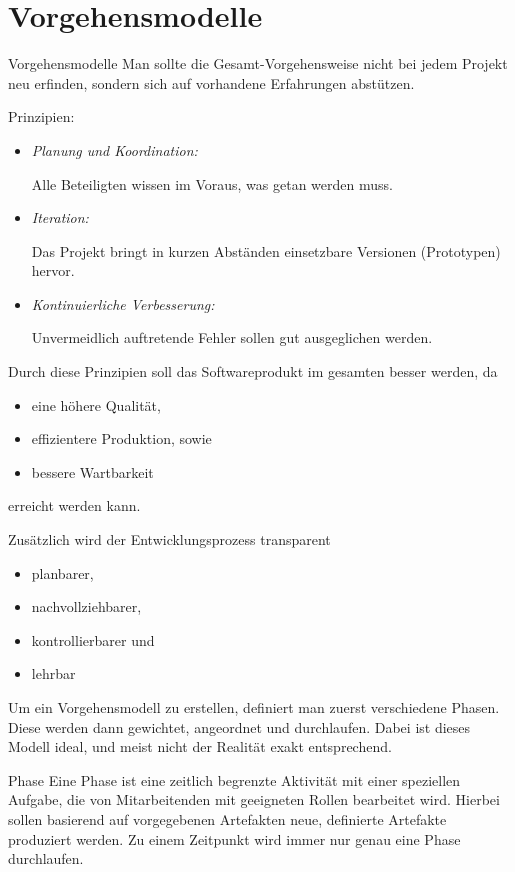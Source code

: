 \section{Vorgehensmodelle}

\begin{defi}{Vorgehensmodelle}
    Man sollte die Gesamt-Vorgehensweise nicht bei jedem Projekt neu erfinden, sondern sich auf vorhandene Erfahrungen abstützen.

    Prinzipien:
    \begin{itemize}
        \item \emph{Planung und Koordination:}

              Alle Beteiligten wissen im Voraus, was getan werden muss.
        \item \emph{Iteration:}

              Das Projekt bringt in kurzen Abständen einsetzbare Versionen (Prototypen) hervor.
        \item \emph{Kontinuierliche Verbesserung:}

              Unvermeidlich auftretende Fehler sollen gut ausgeglichen werden.
    \end{itemize}

    Durch diese Prinzipien soll das Softwareprodukt im gesamten besser werden, da
    \begin{itemize}
        \item eine höhere Qualität,
        \item effizientere Produktion, sowie
        \item bessere Wartbarkeit
    \end{itemize}
    erreicht werden kann.

    Zusätzlich wird der Entwicklungsprozess transparent
    \begin{itemize}
        \item planbarer,
        \item nachvollziehbarer,
        \item kontrollierbarer und
        \item lehrbar
    \end{itemize}

    Um ein Vorgehensmodell zu erstellen, definiert man zuerst verschiedene Phasen.
    Diese werden dann gewichtet, angeordnet und durchlaufen.
    Dabei ist dieses Modell ideal, und meist nicht der Realität exakt entsprechend.
\end{defi}

\begin{defi}{Phase}
    Eine Phase ist eine zeitlich begrenzte Aktivität mit einer speziellen Aufgabe, die von Mitarbeitenden mit geeigneten Rollen bearbeitet wird.
    Hierbei sollen basierend auf vorgegebenen Artefakten neue, definierte Artefakte produziert werden.
    Zu einem Zeitpunkt wird immer nur genau eine Phase durchlaufen.
\end{defi}

